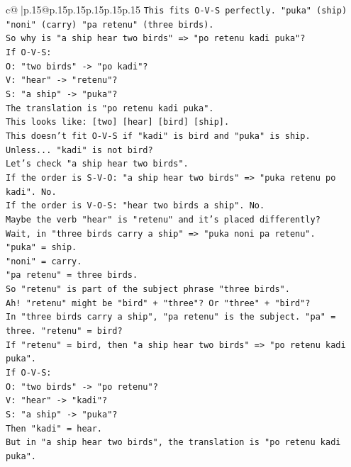 \documentclass{article}
\begin{document}
{\begin{supertabular}{c@{$\;$}|p{.15\linewidth}@{}p{.15\linewidth}p{.15\linewidth}p{.15\linewidth}p{.15\linewidth}p{.15\linewidth}}
{{{\texttt{This fits O{-}V{-}S perfectly. "puka" (ship) "noni" (carry) "pa retenu" (three birds).} \\
\texttt{So why is "a ship hear two birds" => "po retenu kadi puka"?} \\
\texttt{If O{-}V{-}S:} \\
\texttt{O: "two birds" {-}> "po kadi"?} \\
\texttt{V: "hear" {-}> "retenu"?} \\
\texttt{S: "a ship" {-}> "puka"?} \\
\texttt{The translation is "po retenu kadi puka".} \\
\texttt{This looks like: {[}two{]} {[}hear{]} {[}bird{]} {[}ship{]}.} \\
\texttt{This doesn't fit O{-}V{-}S if "kadi" is bird and "puka" is ship.} \\
\texttt{Unless... "kadi" is not bird?} \\
\texttt{Let's check "a ship hear two birds".} \\
\texttt{If the order is S{-}V{-}O: "a ship hear two birds" => "puka retenu po kadi". No.} \\
\texttt{If the order is V{-}O{-}S: "hear two birds a ship". No.} \\
\texttt{Maybe the verb "hear" is "retenu" and it's placed differently?} \\
\texttt{Wait, in "three birds carry a ship" => "puka noni pa retenu".} \\
\texttt{"puka" = ship.} \\
\texttt{"noni" = carry.} \\
\texttt{"pa retenu" = three birds.} \\
\texttt{So "retenu" is part of the subject phrase "three birds".} \\
\texttt{Ah! "retenu" might be "bird" + "three"? Or "three" + "bird"?} \\
\texttt{In "three birds carry a ship", "pa retenu" is the subject. "pa" = three. "retenu" = bird?} \\
\texttt{If "retenu" = bird, then "a ship hear two birds" => "po retenu kadi puka".} \\
\texttt{If O{-}V{-}S:} \\
\texttt{O: "two birds" {-}> "po retenu"?} \\
\texttt{V: "hear" {-}> "kadi"?} \\
\texttt{S: "a ship" {-}> "puka"?} \\
\texttt{Then "kadi" = hear.} \\
\texttt{But in "a ship hear two birds", the translation is "po retenu kadi puka".} \\
}}}
\end{supertabular}}
\end{document}
